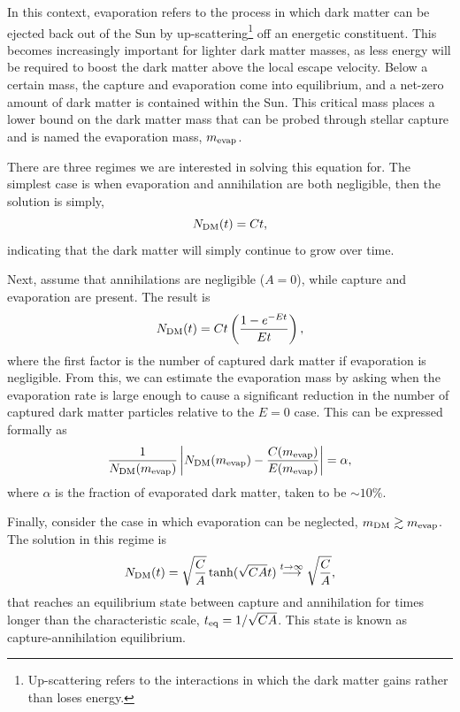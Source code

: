 In this context, evaporation refers to the process in which dark matter can be ejected back out of the Sun by up-scattering\footnote{Up-scattering refers to the interactions in which the dark matter gains rather than loses energy. } off an energetic constituent. This becomes increasingly important for lighter dark matter masses, as less energy will be required to boost the dark matter above the local escape velocity. Below a certain mass, the capture and evaporation come into equilibrium, and a net-zero amount of dark matter is contained within the Sun.
This critical mass places a lower bound on the dark matter mass that can be probed through stellar capture and is named the evaporation mass, $m_\mathrm{evap}$. 

There are three regimes we are interested in solving this equation for. The simplest case is when evaporation and annihilation are both negligible, then the solution is simply, 
\begin{equation}
    N_\mathrm{DM}(t) = C t,
\end{equation}
indicating that the dark matter will simply continue to grow over time.

Next,  assume that annihilations are negligible ($A = 0$), while capture and evaporation are present. The result is
\begin{equation}
    N_\mathrm{DM}(t) = Ct\left(\frac{1 - e^{-E t}}{E t}\right),  
\end{equation}
where the first factor is the number of captured dark matter if evaporation is negligible. From this, we can estimate the evaporation mass by asking when the evaporation rate is large enough to cause a significant reduction in the number of captured dark matter particles relative to the $E=0$ case. This can be expressed formally as~\cite{Garani:2017jcj_may_DarkmatterSun}
\begin{equation}
    \frac{1}{N_\mathrm{DM}(m_\mathrm{evap})}\left| N_\mathrm{DM}(m_\mathrm{evap}) - \frac{C(m_\mathrm{evap})}{E(m_\mathrm{evap})} \right| = \alpha,
\end{equation} 
where $\alpha$ is the fraction of evaporated dark matter, taken to be $\sim 10\%$. 

Finally, consider the case in which evaporation can be neglected, $m_\mathrm{DM}\gtrsim m_\mathrm{evap}$. The solution in this regime is
\begin{equation}
    N_\mathrm{DM}(t) = \sqrt{\frac{C}{A}}\tanh(\sqrt{CA}t)\overset{t\rightarrow\infty}{\longrightarrow} \sqrt{\frac{C}{A}},
\end{equation}
that reaches an equilibrium state between capture and annihilation for times longer than the characteristic scale, $t_{\rm eq} = 1/\sqrt{CA}$. This state is known as capture-annihilation equilibrium.

